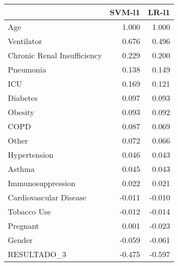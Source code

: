 \begin{tabular}{lrr}
\toprule
{} &  SVM-l1 &  LR-l1 \\
\midrule
Age                         &   1.000 &  1.000 \\
Ventilator                  &   0.676 &  0.496 \\
Chronic Renal Insufficiency &   0.229 &  0.200 \\
Pneumonia                   &   0.138 &  0.149 \\
ICU                         &   0.169 &  0.121 \\
Diabetes                    &   0.097 &  0.093 \\
Obesity                     &   0.093 &  0.092 \\
COPD                        &   0.087 &  0.069 \\
Other                       &   0.072 &  0.066 \\
Hypertension                &   0.046 &  0.043 \\
Asthma                      &   0.045 &  0.043 \\
Immunosuppression           &   0.022 &  0.021 \\
Cardiovascular Disease      &  -0.011 & -0.010 \\
Tobacco Use                 &  -0.012 & -0.014 \\
Pregnant                    &   0.001 & -0.023 \\
Gender                      &  -0.059 & -0.061 \\
RESULTADO\_3                 &  -0.475 & -0.597 \\
\bottomrule
\end{tabular}
